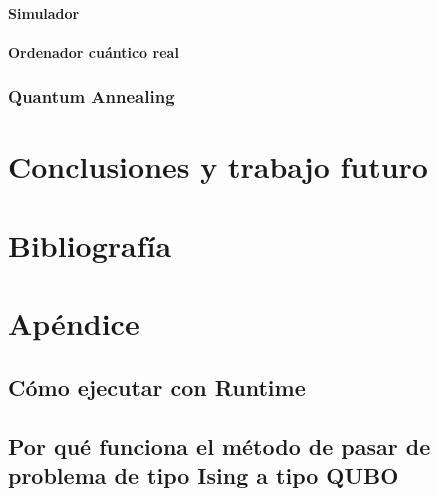 \documentclass{report}
\begin{document}
\subsubsection{Simulador}

\subsubsection{Ordenador cuántico real}

\subsection{Quantum Annealing}

\chapter{Conclusiones y trabajo futuro}

\chapter{Bibliografía}

\chapter{Apéndice}

\section{Cómo ejecutar con Runtime}
\section{Por qué funciona el método de pasar de problema de tipo Ising a tipo QUBO}
\end{document}
